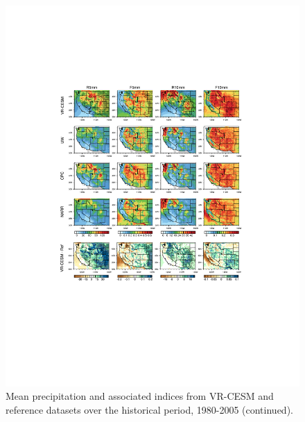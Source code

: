 \documentclass{ametsoc}
\begin{document}
\begin{figure}
\begin{center}
\includegraphics[width=6in, trim={4cm 6.5cm 4cm 4.9cm},clip]{wd_index_Hist_ref_annual_part2.pdf}
\caption{Mean precipitation and associated indices from VR-CESM and reference datasets over the historical period, 1980-2005 (continued).}
\label{fig:histEval2}
\end{center}
\end{figure}
\end{document}
